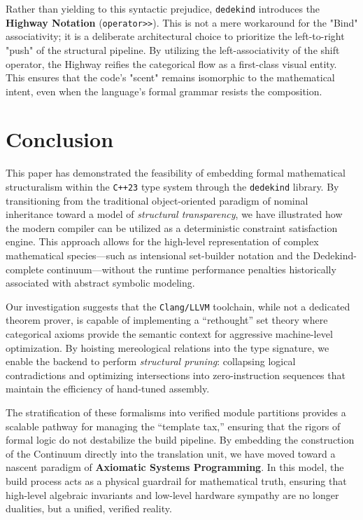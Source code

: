 \documentclass[11pt, a4paper]{report}
\begin{document}
\begin{itemize}
Rather than yielding to this syntactic prejudice, \texttt{dedekind} introduces the \textbf{Highway Notation} (\texttt{operator>>}). This is not a mere workaround for the "Bind" associativity; it is a deliberate architectural choice to prioritize the left-to-right "push" of the structural pipeline. By utilizing the left-associativity of the shift operator, the Highway reifies the categorical flow as a first-class visual entity. This ensures that the code's "scent" remains isomorphic to the mathematical intent, even when the language's formal grammar resists the composition.

\end{itemize}

\chapter{Conclusion}
\label{chap:conclusion}
This paper has demonstrated the feasibility of embedding formal mathematical structuralism within the \texttt{C++23} type system through the \texttt{dedekind} library. By transitioning from the traditional object-oriented paradigm of nominal inheritance toward a model of \textit{structural transparency}, we have illustrated how the modern compiler can be utilized as a deterministic constraint satisfaction engine. This approach allows for the high-level representation of complex mathematical species---such as intensional set-builder notation and the Dedekind-complete continuum---without the runtime performance penalties historically associated with abstract symbolic modeling.

Our investigation suggests that the \texttt{Clang/LLVM} toolchain, while not a dedicated theorem prover, is capable of implementing a ``rethought'' set theory where categorical axioms provide the semantic context for aggressive machine-level optimization. By hoisting mereological relations into the type signature, we enable the backend to perform \textit{structural pruning}: collapsing logical contradictions and optimizing intersections into zero-instruction sequences that maintain the efficiency of hand-tuned assembly. 

The stratification of these formalisms into verified module partitions provides a scalable pathway for managing the ``template tax,'' ensuring that the rigors of formal logic do not destabilize the build pipeline. By embedding the construction of the Continuum directly into the translation unit, we have moved toward a nascent paradigm of \textbf{Axiomatic Systems Programming}. In this model, the build process acts as a physical guardrail for mathematical truth, ensuring that high-level algebraic invariants and low-level hardware sympathy are no longer dualities, but a unified, verified reality.
\end{document}
